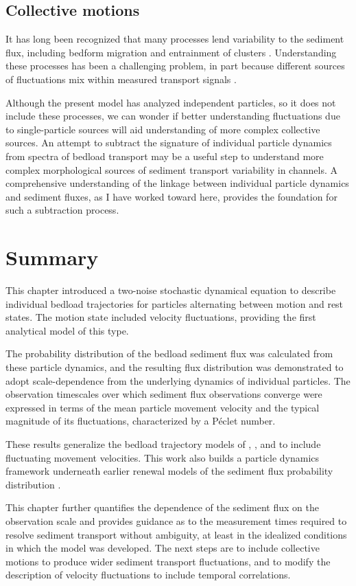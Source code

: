 \subsection{Collective motions}

It has long been recognized that many processes lend variability to the sediment flux, including bedform migration \citep{Hamamori1962,Guala2014} and entrainment of clusters \citep{Strom2004,Papanicolaou2018}.
Understanding these processes has been a challenging problem, in part because different sources of fluctuations mix within measured transport signals \citep[e.g.][]{Hoey1992,Singh2009,Saletti2015,Dhont2018}.

Although the present model has analyzed independent particles, so it does not include these processes, we can wonder if better understanding fluctuations due to single-particle sources will aid understanding of more complex collective sources.
An attempt to subtract the signature of individual particle dynamics from spectra of bedload transport may be a useful step to understand more complex morphological sources of sediment transport variability in channels.
A comprehensive understanding of the linkage between individual particle dynamics and sediment fluxes, as I have worked toward here, provides the foundation for such a subtraction process.

\section{Summary \label{sec:conc}} 
This chapter introduced a two-noise stochastic dynamical equation to describe individual bedload trajectories for particles alternating between motion and rest states. The motion state included velocity fluctuations, providing the first analytical model of this type.
 
The probability distribution of the bedload sediment flux was calculated from these particle dynamics, and the resulting flux distribution was demonstrated to adopt scale-dependence from the underlying dynamics of individual particles.
The observation timescales over which sediment flux observations converge were expressed in terms of the mean particle movement velocity and the typical magnitude of its fluctuations, characterized by a P\'{e}clet number.
 
These results generalize the bedload trajectory models of \citet{Einstein1937}, \citet{Lisle1998}, and \citet{Lajeunesse2017} to include fluctuating movement velocities. This work also builds a particle dynamics framework underneath earlier renewal models of the sediment flux probability distribution \citep{Lajeunesse2010,Ancey2020}.
 
This chapter further quantifies the dependence of the sediment flux on the observation scale and provides guidance as to the measurement times required to resolve sediment transport without ambiguity, at least in the idealized conditions in which the model was developed.
The next steps are to include collective motions to produce wider sediment transport fluctuations, and to modify the description of velocity fluctuations to include temporal correlations.


